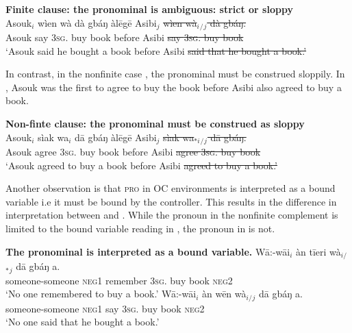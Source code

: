 \documentclass[output=paper,colorlinks,citecolor=brown]{langscibook}
\begin{document}
\ea%
    \label{ex:sulemana:20}
    {\bf{Finite clause: the pronominal is ambiguous: strict or sloppy}}\\
    \gll    Asouk$_i$ wìen wà  dà gbáŋ àlēgē Asibi$_j$  {\sout{wìen wà$_i${}$_/${}$_j$  dà gbáŋ.}} \\
            Asouk say \textsc{3sg}. buy book before Asibi {\sout{say \textsc{3sg}. buy book}}\\
    \glt    `Asouk said he bought a book before Asibi {\sout{said that he bought a book.'}} 
\z

In contrast, in the nonfinite case , the pronominal must be construed sloppily. In , Asouk was the first to agree to buy the book before Asibi also agreed to buy a book.

\ea%
    \label{ex:sulemana:21}
    {\bf{Non-finte clause: the pronominal must be construed as sloppy}}\\
    \gll    Asouk$_i$ sìak wa$_i$ dā gbáŋ àlēgē Asibi$_j$ {\sout{sìak wa$_{*i}${}$_/${}$_j$ dā gbáŋ.}} \\
            Asouk agree \textsc{3sg}. buy book before Asibi {\sout{agree \textsc{3sg}. buy book}}\\
    \glt    `Asouk agreed to buy a book before Asibi {\sout{agreed to buy a book.'}}
\z

Another observation is that \textsc{pro} in OC environments is interpreted as a bound variable i.e it must be bound by the controller. This results in the difference in interpretation between  and . While the pronoun in the nonfinite complement is limited to the bound variable reading in , the pronoun in  is not. 

\ea%
    \label{ex:sulemana:22}
    {\bf{ The pronominal is interpreted as a bound variable.} }
    \ea%
    \label{ex:sulemana:22a}
    \gll    Wā:-wāi$_i$ àn tīeri  wà$_{i/}${}$_*${}$_j$ dā gbáŋ a. \\
            someone-someone  \textsc{neg1} remember \textsc{3sg}. buy book  \textsc{neg2} \\
    \glt    `No one remembered to buy a book.' 
    \ex%
    \label{ex:sulemana:22b}
    \gll    Wā:-wāi$_i$ àn wēn  wà$_{i/}${}$_j$ dā gbáŋ a. \\
            someone-someone \textsc{neg1} say \textsc{3sg}. buy book  \textsc{neg2}\\
    \glt    `No one said that he bought a book.' 
    \z
\z
\end{document}
